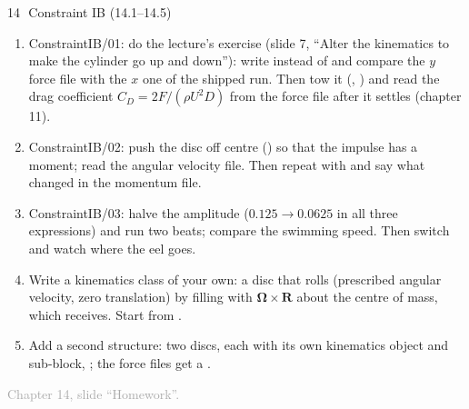 \documentclass[aspectratio=169,11pt]{beamer}
\newcommand{\sourcecredit}[1]{\vfill\begin{flushright}\tiny\textcolor{DarkGray}{#1}\end{flushright}}
\begin{document}
\begin{frame}{14\,\textbullet\ Constraint IB (14.1--14.5)}
\label{fr:c14x1}
\footnotesize
\begin{enumerate}
  \item[14.1] ConstraintIB/01: do the lecture's exercise (slide 7, ``Alter the kinematics to make the cylinder go up and down''): write \code{[0][1][k]} instead of \code{[0][0][k]} and compare the $y$ force file with the $x$ one of the shipped run. Then tow it (, ) and read the drag coefficient $C_D = 2F/(\rho U^2 D)$ from the force file after it settles (chapter 11).
  \item[14.2] ConstraintIB/02: push the disc off centre () so that the impulse has a moment; read the angular velocity file. Then repeat with  and say what changed in the momentum file.
  \item[14.3] ConstraintIB/03: halve the amplitude ($0.125 \to 0.0625$ in all three expressions) and run two beats; compare the swimming speed. Then switch  and watch where the eel goes.
  \item[14.4] Write a kinematics class of your own: a disc that rolls (prescribed angular velocity, zero translation) by filling  with $\boldsymbol{\Omega}\times\mathbf{R}$ about the centre of mass, which  receives. Start from .
  \item[14.5] Add a second structure: two discs, each with its own kinematics object and sub-block, ; the force files get a .
\end{enumerate}
\sourcecredit{Chapter 14, slide ``Homework''.}
\end{frame}
\end{document}
